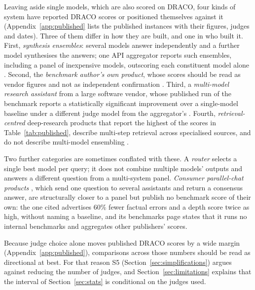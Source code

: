 \documentclass[11pt]{article}
\begin{document}
Leaving aside single models, which are also scored on DRACO, four kinds of system have reported DRACO scores or positioned themselves against it (Appendix~\ref{app:published}
lists the published instances with their figures, judges and dates). Three of them differ in how they are built, and one in who built it. First, \emph{synthesis
ensembles}: several models answer independently and a further model synthesises the
answers; one API aggregator reports such ensembles, including a panel of inexpensive
models, outscoring each constituent model alone \citep{openrouterfusion2026}. Second, the \emph{benchmark author's own product}, whose scores should be read as vendor figures and not as independent confirmation \citep{perplexity2026explainer}. Third, a
\emph{multi-model research assistant} from a large software vendor, whose published
run of the benchmark reports a statistically significant improvement over a single-model baseline
under a different judge model from the aggregator's \citep{msftdraco2026}. Fourth,
\emph{retrieval-centred} deep-research products that report the highest of the scores in Table~\ref{tab:published},
describe multi-step retrieval across specialised sources, and do not describe multi-model
ensembling \citep{valyu2026}.

Two further categories are sometimes conflated with these. A \emph{router}
\citep{notdiamond2024, martian2023} selects a single best model per query; it does not
combine multiple models' outputs and answers a different question from a multi-system
panel. \emph{Consumer parallel-chat products} \citep{allchat2026}, which send one question
to several assistants and return a consensus answer, are structurally closer to a panel
but publish no benchmark score of their own: the one cited advertises 60\% fewer factual errors and a depth score twice as high, without naming a baseline, and its benchmarks page states that it runs no internal benchmarks and aggregates other publishers' scores.

Because judge choice alone moves published DRACO scores by a wide margin (Appendix~\ref{app:published}), comparisons across those numbers should be read as directional at best. For that reason S5 (Section~\ref{sec:simplifications}) argues against reducing the number of judges, and Section~\ref{sec:limitations} explains that the interval of Section~\ref{sec:stats} is conditional on the judges used.
\end{document}
